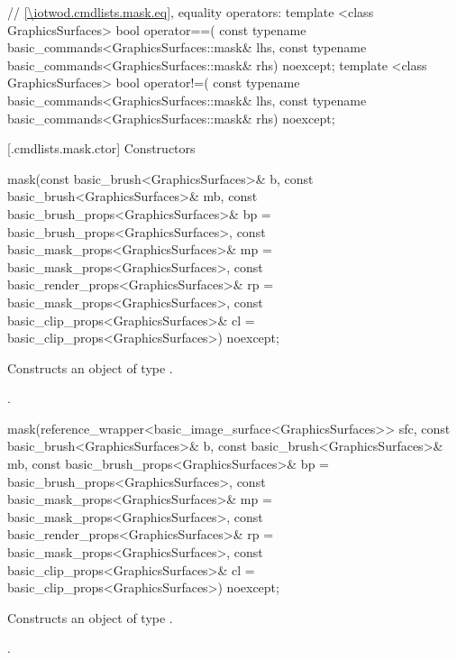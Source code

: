 \begin{codeblock}
{  // \ref{\iotwod.cmdlists.mask.eq}, equality operators:
  template <class GraphicsSurfaces>
  bool operator==(
    const typename basic_commands<GraphicsSurfaces::mask& lhs,
    const typename basic_commands<GraphicsSurfaces::mask& rhs) 
    noexcept;
  template <class GraphicsSurfaces>
  bool operator!=(
    const typename basic_commands<GraphicsSurfaces::mask& lhs,
    const typename basic_commands<GraphicsSurfaces::mask& rhs) 
    noexcept;
}
\end{codeblock}

 [\iotwod.cmdlists.mask.ctor] {Constructors}%

%
\begin{itemdecl}
mask(const basic_brush<GraphicsSurfaces>& b,
  const basic_brush<GraphicsSurfaces>& mb,
  const basic_brush_props<GraphicsSurfaces>& bp = 
  basic_brush_props<GraphicsSurfaces>{},
  const basic_mask_props<GraphicsSurfaces>& mp = 
  basic_mask_props<GraphicsSurfaces>{},
  const basic_render_props<GraphicsSurfaces>& rp = 
  basic_mask_props<GraphicsSurfaces>{},
  const basic_clip_props<GraphicsSurfaces>& cl = 
  basic_clip_props<GraphicsSurfaces>{}) noexcept;
\end{itemdecl}
\begin{itemdescr}
\pnum
\effects Constructs an object of type .

\pnum
\postconditions {}.
\end{itemdescr}

%
\begin{itemdecl}
mask(reference_wrapper<basic_image_surface<GraphicsSurfaces>> sfc,
  const basic_brush<GraphicsSurfaces>& b,
  const basic_brush<GraphicsSurfaces>& mb,
  const basic_brush_props<GraphicsSurfaces>& bp = 
  basic_brush_props<GraphicsSurfaces>{},
  const basic_mask_props<GraphicsSurfaces>& mp = 
  basic_mask_props<GraphicsSurfaces>{},
  const basic_render_props<GraphicsSurfaces>& rp = 
  basic_mask_props<GraphicsSurfaces>{},
  const basic_clip_props<GraphicsSurfaces>& cl = 
  basic_clip_props<GraphicsSurfaces>{}) noexcept;
\end{itemdecl}
\begin{itemdescr}
\pnum
\effects Constructs an object of type .

\pnum
\postconditions {}.
\end{itemdescr}

